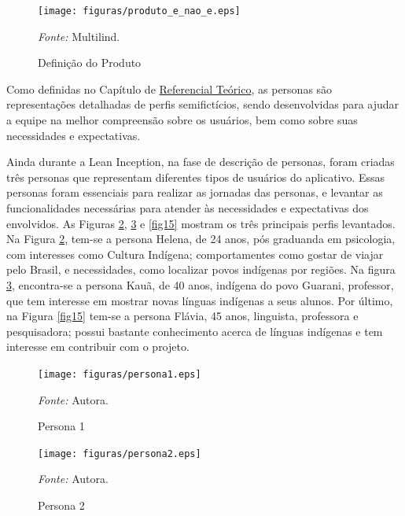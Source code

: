 \begin{figure}[h!]
	\centering
	\caption{Definição do Produto}
	\begin{adjustbox}{center}
		\texttt{[image: figuras/produto\_e\_nao\_e.eps]}
	\end{adjustbox}
	\begin{tablenotes}[flushleft]
		\centering
		\item \textit{Fonte:} Multilind.
	\end{tablenotes}
	\label{fig12}
\end{figure}

Como definidas no Capítulo de \hyperref[chap:Referencial]{Referencial Teórico}, as personas são representações detalhadas de perfis semifictícios, sendo desenvolvidas para ajudar a equipe na melhor compreensão sobre os usuários, bem 
como sobre suas necessidades e expectativas. 

Ainda durante a Lean Inception, na fase de descrição de personas, foram criadas três personas que representam diferentes tipos de usuários do aplicativo. Essas personas foram essenciais para realizar as jornadas das personas, e levantar as 
funcionalidades necessárias para atender às necessidades e expectativas dos envolvidos. As Figuras \ref{fig13}, \ref{fig14} e \ref{fig15} mostram os três principais perfis levantados.  Na Figura \ref{fig13}, tem-se a persona Helena, de 24 anos, pós 
graduanda em psicologia, com interesses como Cultura Indígena; comportamentes como gostar de viajar pelo Brasil, e necessidades, como localizar povos indígenas por regiões. Na figura \ref{fig14}, encontra-se a persona Kauã, de 40 anos, indígena do povo 
Guarani, professor, que tem interesse em mostrar novas línguas indígenas a seus alunos. Por último, na Figura \ref{fig15} tem-se a persona Flávia, 45 anos, linguista, professora e pesquisadora; possui bastante conhecimento acerca de línguas indígenas e 
tem interesse em contribuir com o projeto.

\begin{figure}[h!]
	\centering
	\caption{Persona 1}
	\begin{adjustbox}{center}
		\texttt{[image: figuras/persona1.eps]}
	\end{adjustbox}
	\begin{tablenotes}[flushleft]
		\centering
		\item \textit{Fonte:} Autora.
	\end{tablenotes}
	\label{fig13}
\end{figure}

\begin{figure}[h!]
	\centering
	\caption{Persona 2}
	\begin{adjustbox}{center}
		\texttt{[image: figuras/persona2.eps]}
	\end{adjustbox}
	\begin{tablenotes}[flushleft]
		\centering
		\item \textit{Fonte:} Autora.
	\end{tablenotes}
	\label{fig14}
\end{figure}

